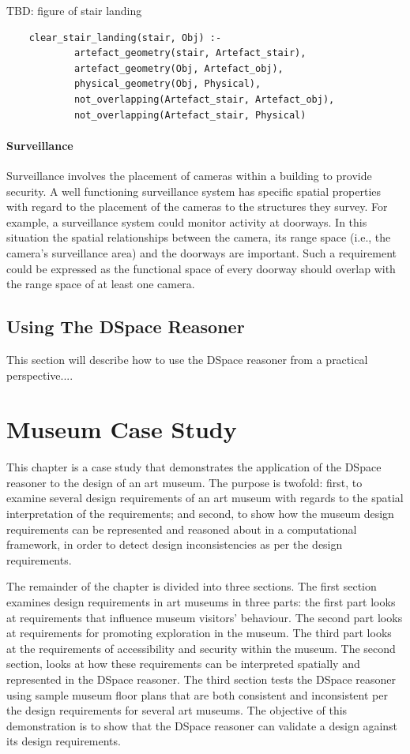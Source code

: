 \documentclass[12pt]{ucthesis}
\begin{document}
TBD: figure of stair landing

\begin{verbatim}
    clear_stair_landing(stair, Obj) :- 
            artefact_geometry(stair, Artefact_stair),
            artefact_geometry(Obj, Artefact_obj),
            physical_geometry(Obj, Physical),
            not_overlapping(Artefact_stair, Artefact_obj),
            not_overlapping(Artefact_stair, Physical)
\end{verbatim}  

\subsubsection{Surveillance}
Surveillance involves the placement of cameras within a building to provide security. A well functioning surveillance system has specific spatial properties with regard to the placement of the cameras to the structures they survey. For example, a surveillance system could monitor activity at doorways. In this situation the spatial relationships between the camera, its range space (i.e., the camera's surveillance area) and the doorways are important. Such a requirement could be expressed as the functional space of every doorway should overlap with the range space of at least one camera. 

\section{Using The DSpace Reasoner}

This section will describe how to use the DSpace reasoner from a practical perspective....

\chapter{Museum Case Study}
This chapter is a case study that demonstrates the application of the DSpace reasoner to the design of an art museum. The purpose is twofold: first, to examine several design requirements of an art museum with regards to the spatial interpretation of the requirements; and second, to show how the museum design requirements can be represented and reasoned about in a computational framework, in order to detect design inconsistencies as per the design requirements.

The remainder of the chapter is divided into three sections. The first section examines design requirements in art museums in three parts: the first part looks at requirements that influence museum visitors' behaviour. The second part looks at requirements for promoting exploration in the museum. The third part looks at the requirements of accessibility and security within the museum. The second section, looks at how these requirements can be interpreted spatially and represented in the DSpace reasoner. The third section tests the DSpace reasoner using sample museum floor plans that are both consistent and inconsistent per the design requirements for several art museums. The objective of this demonstration is to show that the DSpace reasoner can validate a design against its design requirements.
\end{document}
